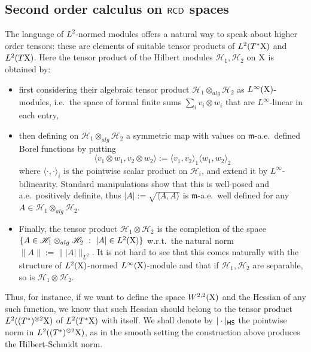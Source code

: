 \documentclass[11pt]{article}
\numberwithin{equation}{section}
\newcommand{\X}{{\rm X}}
\newcommand{\mm}{{\mathfrak m}}
\newcommand{\RCD}{{\sf RCD}}
\newcommand\la{\langle}
\newcommand\ra{\rangle}
\newcommand{\HS}{\sf HS}
\newcommand{\Hi}{\mathscr H}
\begin{document}
\subsection{Second order calculus on $\RCD$ spaces}\label{se:secondordercalc}
The language of $L^2$-normed modules offers a natural way to speak about higher order tensors: these are elements of suitable tensor products of $L^2(T^*\X)$ and $L^2(T\X)$. Here the tensor product of the Hilbert modules $\Hi_1,\Hi_2$ on $\X$ is obtained by:
\begin{itemize}
\item[-] first considering their algebraic tensor product $\Hi_1\otimes_{alg}\Hi_2$ as $L^\infty(\X)$-modules, i.e.\ the space of formal finite sums $\sum_iv_i\otimes w_i$ that are $L^\infty$-linear in each entry,
\item[-] then  defining on $\Hi_1\otimes_{alg}\Hi_2$ a symmetric map with values on $\mm$-a.e.\ defined Borel functions by putting
\[
\la v_1\otimes w_1,v_2\otimes w_2\ra:=\la v_1,v_2\ra_{1}\la w_1,w_2\ra_{2}
\]
where $\la\cdot,\cdot\ra_i$ is the pointwise scalar product on $\Hi_i$, and extend it by $L^\infty$-bilinearity. Standard manipulations show that this is well-posed and a.e.\ positively definite, thus $|A|:=\sqrt{\la A,A\ra}$ is $\mm$-a.e.\ well defined for any $A\in \Hi_1\otimes_{alg}\Hi_2$.
\item[-] Finally, the tensor product $\Hi_1\otimes\Hi_2$ is the completion of  the space $\{A\in \Hi_1\otimes_{alg}\Hi_2\ :\ |A|\in L^2(\X) \}$  w.r.t.\ the natural norm $\|A\|:=\||A|\|_{L^2}$.  It is not hard to see that this comes naturally with the structure of $L^2(\X)$-normed $L^\infty(\X)$-module and that if $\Hi_1,\Hi_2$ are separable, so is $\Hi_1\otimes\Hi_2$.
\end{itemize}
Thus, for instance, if we want to define the space $W^{2,2}(\X)$ and the Hessian of any such function, we know that such Hessian should belong to the tensor product  $L^2((T^*)^{\otimes 2}\X)$ of $L^2(T^*\X)$ with itself. We shall denote by $|\cdot|_{\HS}$ the pointwise norm in $L^2((T^*)^{\otimes 2}\X)$, as in the smooth setting the construction above produces the Hilbert-Schmidt norm.
\end{document}
